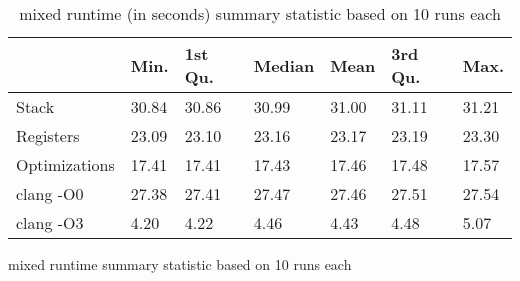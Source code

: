 \begin{table}[h!]
\centering
\begin{tabular}{p{}p{}p{}p{}p{}p{}p{}}
  \hline
 & Min. & 1st Qu. & Median & Mean & 3rd Qu. & Max. \\ 
  \hline
Stack & 30.84 & 30.86 & 30.99 & 31.00 & 31.11 & 31.21 \\ 
  Registers & 23.09 & 23.10 & 23.16 & 23.17 & 23.19 & 23.30 \\ 
  Optimizations & 17.41 & 17.41 & 17.43 & 17.46 & 17.48 & 17.57 \\ 
  clang -O0 & 27.38 & 27.41 & 27.47 & 27.46 & 27.51 & 27.54 \\ 
  clang -O3 & 4.20 & 4.22 & 4.46 & 4.43 & 4.48 & 5.07 \\ 
   \hline
\end{tabular}
\caption{mixed runtime summary statistic based on 10 runs each}
\caption{mixed runtime (in seconds) summary statistic based on 10 runs each}
\end{table}
